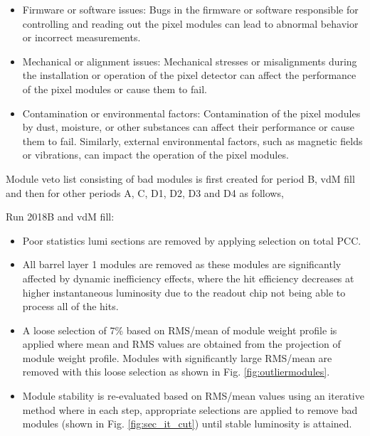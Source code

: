 \begin{itemize}
\item Firmware or software issues: Bugs in the firmware or software responsible for controlling and reading out the pixel modules can lead to abnormal behavior or incorrect measurements.

\item Mechanical or alignment issues: Mechanical stresses or misalignments during the installation or operation of the pixel detector can affect the performance of the pixel modules or cause them to fail.

\item Contamination or environmental factors: Contamination of the pixel modules by dust, moisture, or other substances can affect their performance or cause them to fail. Similarly, external environmental factors, such as magnetic fields or vibrations, can impact the operation of the pixel modules.

\end{itemize}


Module veto list consisting of bad modules is first created for period B, vdM fill and then for other periods A, C, D1, D2, D3 and D4 as follows, 

Run 2018B and vdM fill:
\begin{itemize}

\item Poor statistics lumi sections are removed by applying selection on total PCC. %

\item All barrel layer 1 modules are removed as these modules are significantly affected by dynamic inefficiency effects, where the hit efficiency decreases at higher instantaneous luminosity due to the readout chip not being able to process all of the hits.
  
\item A loose selection of 7\% based on RMS/mean of module weight profile is applied where mean and RMS values are obtained from the projection of module weight profile. Modules with significantly large RMS/mean are removed with this loose selection as shown in Fig. \ref{fig:outliermodules}. 

\item Module stability is re-evaluated based on RMS/mean values using an iterative method where in each step, appropriate selections are applied to remove bad modules (shown in Fig. \ref{fig:sec_it_cut}) until stable luminosity is attained.                                                      
\end{itemize}

